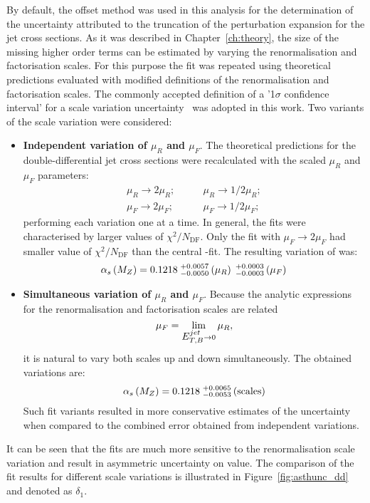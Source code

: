 By default, the offset method was used in this analysis for the determination of the uncertainty attributed to the truncation of the perturbation expansion for the jet cross sections. As it was described in Chapter~\ref{ch:theory}, the size of the missing higher order terms can be estimated by varying the renormalisation and factorisation scales. For this purpose the \asz fit was repeated using theoretical predictions evaluated with modified definitions of the renormalisation and factorisation scales. The commonly accepted definition of a '1$\sigma$ confidence interval' for a scale variation uncertainty~\cite{soper:1997} was adopted in this work. Two variants of the scale variation were considered:
\begin{itemize}
 \item \textbf{Independent variation of $\mu_R$ and $\mu_F$}. The theoretical predictions for the double-differential jet cross sections were recalculated with the scaled $\mu_R$ and $\mu_F$ parameters:
\begin{align}
 \mu_R \rightarrow 2\mu_R;&\qquad \mu_R \rightarrow 1/2\mu_R;\\
 \mu_F \rightarrow 2\mu_F;&\qquad \mu_F \rightarrow 1/2\mu_F;
\end{align}
performing each variation one at a time. In general, the fits were characterised by larger values of $\chi^2/N_\text{DF}$. Only the fit with $\mu_F \rightarrow 2\mu_F$ had smaller value of $\chi^2/N_\text{DF}$ than the central \asz-fit. The resulting variation of \asz was:
\begin{equation}
 \mbox{$\alpha_{s}\left(M_{Z}\right)$} = 0.1218\;^{+0.0057}_{-0.0050}\left(\mu_R\right)\;^{+0.0003}_{-0.0003}\left(\mu_F\right)
\end{equation}
\item \textbf{Simultaneous variation of $\mu_R$ and $\mu_F$}. Because the analytic expressions for the renormalisation and factorisation scales are related
\begin{equation}
 \mu_F = \lim_{\mbox{$E_{T,B}^{jet}$} \rightarrow 0} \mu_R,
\end{equation}
it is natural to vary both scales up and down simultaneously. The obtained variations are:
\begin{equation}
 \mbox{$\alpha_{s}\left(M_{Z}\right)$} = 0.1218\;^{+0.0065}_{-0.0053}\left(\text{scales}\right)
\end{equation}
Such fit variants resulted in more conservative estimates of the uncertainty when compared to the combined error obtained from independent variations. 
\end{itemize}
It can be seen that the fits are much more sensitive to the renormalisation scale variation and result in asymmetric uncertainty on \asz value. The comparison of the fit results for different scale variations is illustrated in Figure~\ref{fig:asthunc_dd} and denoted as $\delta_1$.

